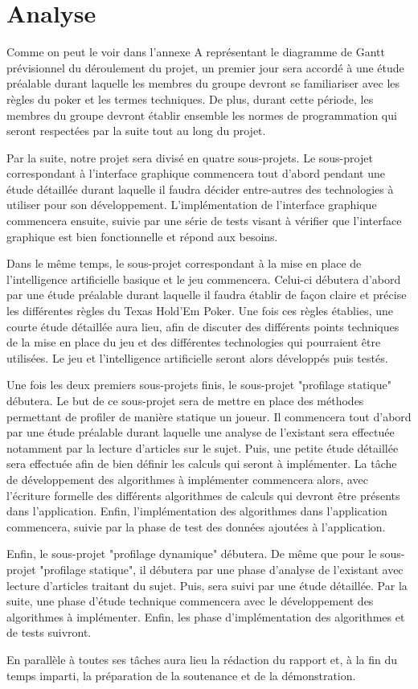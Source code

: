 \documentclass{report}
\begin{document}
\section{Analyse}
\hspace{0.5cm}Comme on peut le voir dans l'annexe A représentant le diagramme de Gantt prévisionnel du déroulement du projet, un premier jour sera accordé à une étude préalable durant laquelle les membres du groupe devront se familiariser avec les règles du poker et les termes techniques. De plus, durant cette période, les membres du groupe devront établir ensemble les normes de programmation qui seront respectées par la suite tout au long du projet.\par
Par la suite, notre projet sera divisé en quatre sous-projets. 
Le sous-projet correspondant à l'interface graphique commencera tout d'abord pendant une étude détaillée durant laquelle il faudra décider entre-autres des technologies à utiliser pour son développement. L'implémentation de l'interface graphique commencera ensuite, suivie par une série de tests visant à vérifier que l'interface graphique est bien fonctionnelle et répond aux besoins. \par
Dans le même temps, le sous-projet correspondant à la mise en place de l'intelligence artificielle basique et le jeu commencera. Celui-ci débutera d'abord par une étude préalable durant laquelle il faudra établir de façon claire et précise les différentes règles du Texas Hold'Em Poker. Une fois ces règles établies, une courte étude détaillée aura lieu, afin de discuter des différents points techniques de la mise en place du jeu et des différentes technologies qui pourraient être utilisées. Le jeu et l'intelligence artificielle seront alors développés puis testés.\par
Une fois les deux premiers sous-projets finis, le sous-projet "profilage statique" débutera. Le but de ce sous-projet sera de mettre en place des méthodes permettant de profiler de manière statique un joueur. Il commencera tout d'abord par une étude préalable durant laquelle une analyse de l'existant sera effectuée notamment par la lecture d'articles sur le sujet. Puis, une petite étude détaillée sera effectuée afin de bien définir les calculs qui seront à implémenter. La tâche de développement des algorithmes à implémenter commencera alors, avec l'écriture formelle des différents algorithmes de calculs qui devront être présents dans l'application. Enfin, l'implémentation des algorithmes dans l'application commencera, suivie par la phase de test des données ajoutées à l'application. \par
Enfin, le sous-projet "profilage dynamique" débutera. De même que pour le sous-projet "profilage statique", il débutera par une phase d'analyse de l'existant avec lecture d'articles traitant du sujet. Puis, sera suivi par une étude détaillée. Par la suite, une phase d'étude technique commencera avec le développement des algorithmes à implémenter. Enfin, les phase d'implémentation des algorithmes et de tests suivront.\par
En parallèle à toutes ses tâches aura lieu la rédaction du rapport et, à la fin du temps imparti, la préparation de la soutenance et de la démonstration. \par
\end{document}
